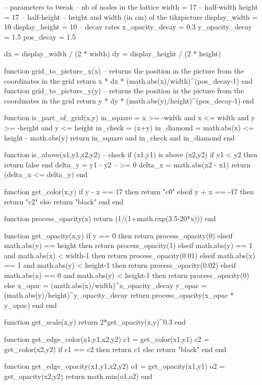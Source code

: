 \begin{luacode}
-- parameters to tweak
-- nb of nodes in the lattice
width = 17 -- half-width
height = 17 -- half-height
-- height and width (in cm) of the tikzpicture
display_width = 10
display_height = 10
-- decay rates 
x_opacity_decay = 0.3
y_opacity_decay = 1.5
pos_decay = 1.5

dx = display_width / (2 * width)
dy = display_height / (2 * height)

function grid_to_picture_x(x)
	-- returns the position in the picture from the coordinates in the grid
	return x * dx * (math.abs(x)/width)^(pos_decay-1)
end 
function grid_to_picture_y(y)
	-- returns the position in the picture from the coordinates in the grid
	return y * dy * (math.abs(y)/height)^(pos_decay-1)
end

function is_part_of_grid(x,y)
	in_square = x >= -width and x <= width and y >= -height and y <= height
	in_check = (x+y)%
	in_diamond = math.abs(x) <= height - math.abs(y)
	return in_square and in_check and in_diamond
end

function is_above(x1,y1,x2,y2) -- check if (x1,y1) is above (x2,y2)
	if y1 < y2 then
		return false
	end
	delta_y = y1 - y2 -- >= 0
	delta_x = math.abs(x2 - x1)
	return (delta_x <= delta_y)
end

function get_color(x,y)
	if y - x == 17 then
		return "c0"
	elseif y + x == -17 then
		return "c2"
	else
		return "black" 
	end
end

function process_opacity(x)
	return (1/(1+math.exp(3.5-20*x)))
end

function get_opacity(x,y)
	if y == 0 then
		return process_opacity(0)
	elseif math.abs(y) == height then
		return process_opacity(1)
	elseif math.abs(y) == 1 and math.abs(x) < width-1 then
		return process_opacity(0.01)
	elseif math.abs(x) == 1 and math.abs(y) < height-1 then
		return process_opacity(0.02)
	elseif math.abs(x) == 0 and math.abs(y) < height-1 then
		return process_opacity(0)
	else
		x_opac = (math.abs(x)/width)^x_opacity_decay
		y_opac = (math.abs(y)/height)^y_opacity_decay
		return process_opacity(x_opac * y_opac)
	end
end

function get_scale(x,y)
	return 2*get_opacity(x,y)^0.3
end

function get_edge_color(x1,y1,x2,y2)
	c1 = get_color(x1,y1)
	c2 = get_color(x2,y2)
	if c1 == c2 then
		return c1
	else 
		return "black"
	end
end

function get_edge_opacity(x1,y1,x2,y2)
	o1 = get_opacity(x1,y1)
	o2 = get_opacity(x2,y2)
	return math.min(o1,o2)
end


\end{luacode}
